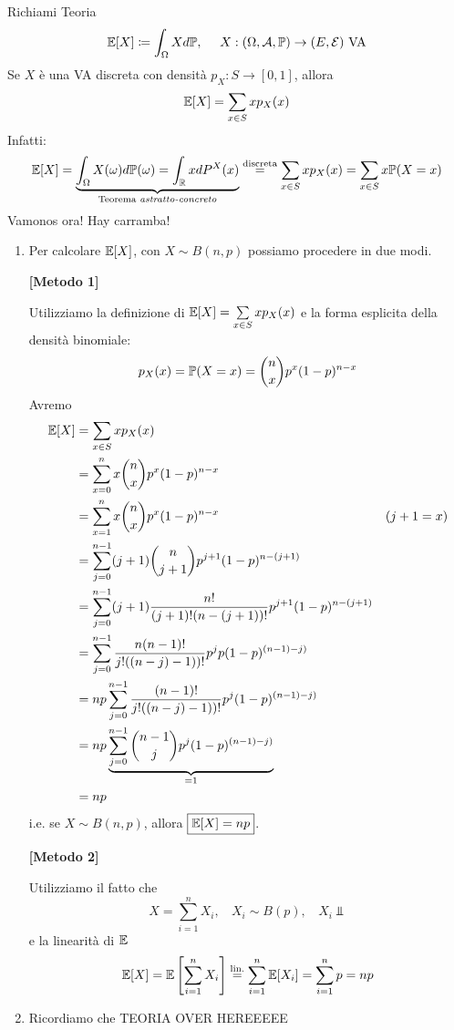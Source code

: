 Richiami Teoria
\begin{equation*}
\mathbb{E}[X] \coloneqq \int_{\Omega } Xd\mathbb{P} ,\ \ \ \ X:(\Omega,\mathcal{A},\mathbb{P})\rightarrow (E,\mathcal{E}) \ \text{VA}
\end{equation*}
Se $X$ è una VA discreta con densità $p_{X} :S\rightarrow [0,1]$, allora
\begin{equation*}
\mathbb{E}[X] =\sum\limits_{x\in S} xp_{X}(x)
\end{equation*}
Infatti:
\begin{equation*}
\mathbb{E}[X] =\underbrace{\int_{\Omega } X(\omega) d\mathbb{P}(\omega) =\int_{\mathbb{R}} xdP^{X}(x)}_{\text{Teorema \emph{astratto-concreto}}}\overset{\text{discreta}}{=}\sum\limits_{x\in S} xp_{X}(x) =\sum\limits_{x\in S} x\mathbb{P}(X=x)
\end{equation*}
Vamonos ora! Hay carramba!
\begin{enumerate}
\item Per calcolare $\mathbb{E}[X]$, con $X\sim B(n,p)$ possiamo procedere in due modi.

\textbf{[Metodo 1]}

Utilizziamo la definizione di $\mathbb{E}[X] =\sum\limits_{x\in S} xp_{X}(x)$ e la forma esplicita della densità binomiale:
\begin{equation*}
p_{X}(x) =\mathbb{P}(X=x) =\binom{n}{x} p^{x}(1-p)^{n-x}
\end{equation*}
Avremo
\begin{align*}
\mathbb{E}[X] & =\sum\limits_{x\in S} xp_{X}(x) & \\
 & =\sum\limits_{x=0}^{n} x\binom{n}{x} p^{x}(1-p)^{n-x} & \\
 & =\sum\limits_{x=1}^{n} x\binom{n}{x} p^{x}(1-p)^{n-x} & (j+1=x)\\
 & =\sum\limits_{j=0}^{n-1}(j+1)\binom{n}{j+1} p^{j+1}(1-p)^{n-(j+1)} & \\
 & =\sum\limits_{j=0}^{n-1}(j+1)\frac{n!}{(j+1) !(n-(j+1)) !} p^{j+1}(1-p)^{n-(j+1)} & \\
 & =\sum\limits_{j=0}^{n-1}\frac{n(n-1) !}{j!((n-j) -1)) !} p^{j} p(1-p)^{(n-1) -j)} & \\
 & =np\sum\limits_{j=0}^{n-1}\frac{(n-1) !}{j!((n-j) -1)) !} p^{j}(1-p)^{(n-1) -j)} & \\
 & =np\underbrace{\sum\limits_{j=0}^{n-1}\binom{n-1}{j} p^{j}(1-p)^{(n-1) -j)}}_{=1} & \\
 & =np & 
\end{align*}
i.e. se $X\sim B(n,p)$, allora $\boxed{\mathbb{E}[X] =np}$.

\textbf{[Metodo 2]}

Utilizziamo il fatto che
\begin{equation*}
X=\sum\limits_{i=1}^{n} X_{i} ,\ \ \ \ X_{i} \sim B(p) ,\ \ \ \ X_{i} \Bot 
\end{equation*}
e la linearità di $\mathbb{E}$
\begin{equation*}
\mathbb{E}[X] =\mathbb{E}\left[\sum\limits_{i=1}^{n} X_{i}\right]\overset{\text{lin.}}{=}\sum\limits_{i=1}^{n}\mathbb{E}[X_{i}] =\sum\limits_{i=1}^{n} p=np
\end{equation*}
\item Ricordiamo che TEORIA OVER HEREEEEE


\end{enumerate}
